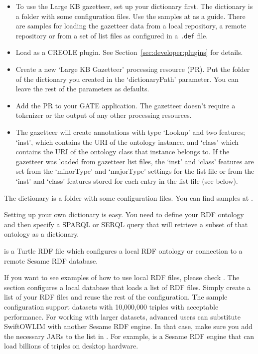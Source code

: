 \begin{itemize}
\item{} To use the Large KB gazetteer, set up your dictionary first. The
dictionary is a folder with some configuration files. Use the samples at
 as a guide. There are 
samples for loading the gazetteer data from a local repository, a remote
repository or from a set of list files as configured in a \texttt{.def} file.

\item{} Load  as a CREOLE plugin.
See Section~\ref{sec:developer:plugins} for details.

\item{} Create a new `Large KB Gazetteer' processing resource (PR). Put the
folder of the dictionary you created in the `dictionaryPath' parameter. You can
leave the rest of the parameters as defaults.

\item{} Add the PR to your GATE application. The gazetteer doesn't require a
tokenizer or the output of any other processing resources.

\item{} The gazetteer will create annotations with type `Lookup' and two
features; `inst', which contains the URI of the ontology instance, and `class'
which contains the URI of the ontology class that instance belongs to. If
the gazetteer was loaded from gazetteer list files, the `inst' and `class'
features are set from the `minorType' and `majorType' settings for the list
file or from the `inst' and `class' features stored for each entry in
the list file (see below).
\end{itemize}


The dictionary is a folder with some configuration files. You can find samples at
.

Setting up your own dictionary is easy. You need to define your RDF ontology
and then specify a SPARQL or SERQL query that will retrieve a subset of that
ontology as a dictionary.

 is a Turtle RDF file which configures a local RDF
ontology or connection to a remote Sesame RDF database.

If you want to see examples of how to use local RDF files, please check
. The
 section configures a local
 database that loads a
list of RDF files. Simply create a list of your RDF files and reuse the rest of
the configuration. The sample configuration support datasets with 10,000,000
triples with acceptable performance. For working with larger datasets, advanced
users can substitute SwiftOWLIM with another Sesame RDF engine. In that case,
make sure you add the necessary JARs to the list in
. For example,
 is a Sesame RDF
engine that can load billions of triples on desktop hardware.


